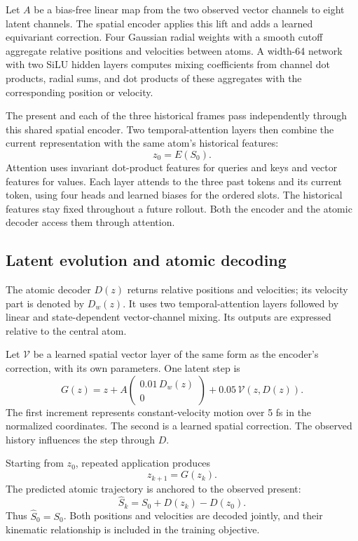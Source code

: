 \documentclass[11pt,a4paper]{article}
\numberwithin{equation}{section}
\begin{document}
Let $A$ be a bias-free linear map from the two observed vector channels to
eight latent channels. The spatial encoder applies this lift and adds a
learned equivariant correction. Four Gaussian radial weights with a smooth
cutoff aggregate relative positions and velocities between atoms. A width-64
network with two SiLU hidden layers computes mixing coefficients from channel
dot products, radial sums, and dot products of these aggregates with the
corresponding position or velocity.

The present and each of the three historical frames pass independently
through this shared spatial encoder. Two temporal-attention layers then
combine the current representation with the same atom's historical features:
\begin{equation}
\boxed{z_0=E(S_0).}
\label{eq:encoder}
\end{equation}
Attention uses invariant dot-product features for queries and keys and vector
features for values. Each layer attends to the three past tokens and its
current token, using four heads and learned biases for the ordered slots.
The historical features stay fixed throughout a future rollout. Both the
encoder and the atomic decoder access them through attention.

\subsection{Latent evolution and atomic decoding}

The atomic decoder $D(z)$ returns relative positions and velocities; its
velocity part is denoted by $D_w(z)$. It uses two
temporal-attention layers followed by linear and state-dependent
vector-channel mixing. Its outputs are expressed relative to the central atom.

Let $\mathcal V$ be a learned spatial vector layer of the same form as the
encoder's correction, with its own parameters. One latent step is
\begin{equation}
\boxed{G(z)=z+A\!\begin{pmatrix}0.01\,D_w(z)\\0\end{pmatrix}
+0.05\,\mathcal V\!\left(z,D(z)\right).}
\label{eq:step}
\end{equation}
The first increment represents constant-velocity motion over 5 fs in the
normalized coordinates. The second is a learned spatial correction.
The observed history influences the step through $D$.

Starting from $z_0$, repeated application produces
\begin{equation}
z_{k+1}=G(z_k).
\end{equation}
The predicted atomic trajectory is anchored to the observed present:
\begin{equation}
\boxed{\widehat S_k=S_0+D(z_k)-D(z_0).}
\label{eq:atomic-readout}
\end{equation}
Thus $\widehat S_0=S_0$. Both positions and velocities are decoded jointly,
and their kinematic relationship is included in the training objective.
\end{document}
